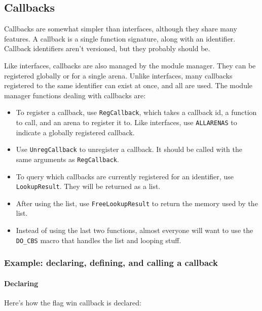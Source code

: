 \documentclass{article}
\begin{document}
\subsection{Callbacks}

Callbacks are somewhat simpler than interfaces, although they share many
features. A callback is a single function signature, along with an
identifier. Callback identifiers aren't versioned, but they probably
should be.

Like interfaces, callbacks are also managed by the module manager. They
can be registered globally or for a single arena. Unlike interfaces,
many callbacks registered to the same identifier can exist at once, and
all are used. The module manager functions dealing with callbacks are:

\begin{itemize}

\item To register a callback, use \verb/RegCallback/, which takes a
callback id, a function to call, and an arena to register it to. Like
interfaces, use \verb/ALLARENAS/ to indicate a globally registered
callback.

\item Use \verb/UnregCallback/ to unregister a callback. It should be
called with the same arguments as \verb/RegCallback/.

\item To query which callbacks are currently registered for an
identifier, use \verb/LookupResult/. They will be returned as a list.

\item After using the list, use \verb/FreeLookupResult/ to return the
memory used by the list.

\item Instead of using the last two functions, almost everyone will want
to use the \verb/DO_CBS/ macro that handles the list and looping stuff.

\end{itemize}


\subsubsection{Example: declaring, defining, and calling a callback}

\paragraph{Declaring}
Here's how the flag win callback is declared:
\end{document}
